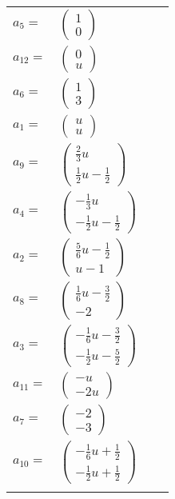 \documentclass[1p]{elsarticle_modified}
\theoremstyle{definition}
\begin{document}
\begin{tabular}{m{7pt} m{180pt} m{7pt} m{180pt} }
\flushright $a_{5}=$&$\begin{pmatrix}1\\0\end{pmatrix}$ \\
\flushright $a_{12}=$&$\begin{pmatrix}0\\u\end{pmatrix}$ \\
\flushright $a_{6}=$&$\begin{pmatrix}1\\3\end{pmatrix}$ \\
\flushright $a_{1}=$&$\begin{pmatrix}u\\u\end{pmatrix}$ \\
\flushright $a_{9}=$&$\begin{pmatrix}\frac{2}{3} u\\\frac{1}{2} u-\frac{1}{2}\end{pmatrix}$ \\
\flushright $a_{4}=$&$\begin{pmatrix}-\frac{1}{3} u\\-\frac{1}{2} u-\frac{1}{2}\end{pmatrix}$ \\
\flushright $a_{2}=$&$\begin{pmatrix}\frac{5}{6} u-\frac{1}{2}\\u-1\end{pmatrix}$ \\
\flushright $a_{8}=$&$\begin{pmatrix}\frac{1}{6} u-\frac{3}{2}\\-2\end{pmatrix}$ \\
\flushright $a_{3}=$&$\begin{pmatrix}-\frac{1}{6} u-\frac{3}{2}\\-\frac{1}{2} u-\frac{5}{2}\end{pmatrix}$ \\
\flushright $a_{11}=$&$\begin{pmatrix}- u\\-2 u\end{pmatrix}$ \\
\flushright $a_{7}=$&$\begin{pmatrix}-2\\-3\end{pmatrix}$ \\
\flushright $a_{10}=$&$\begin{pmatrix}-\frac{1}{6} u+\frac{1}{2}\\-\frac{1}{2} u+\frac{1}{2}\end{pmatrix}$\\&\end{tabular}
\end{document}
